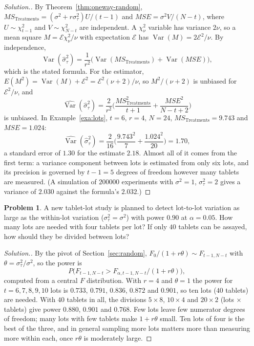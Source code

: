 \documentclass[11pt,a4paper]{article}
\numberwithin{equation}{section}
\DeclareMathOperator{\Var}{Var}
\theoremstyle{definition}
\newtheorem{problemx}{Problem}[subsection]
\newenvironment{problem}{\begin{problemx}}{\end{problemx}}
\newenvironment{solution}
  {\renewcommand{\qedsymbol}{}\begin{proof}[\textit{Solution}.]}
  {\end{proof}}
\begin{document}
\begin{solution}
By Theorem~\ref{thm:oneway-random}, $MS_{\mathrm{Treatments}} = (\sigma^2 + r\sigma^2_\tau)U/(t - 1)$ and $MSE = \sigma^2V/(N - t)$, where $U \sim \chi^2_{t-1}$ and $V \sim \chi^2_{N-t}$ are independent. A
$\chi^2_\nu$ variable has variance $2\nu$, so a mean square $M = \mathcal E\chi^2_\nu/\nu$ with expectation $\mathcal E$ has $\Var(M) = 2\mathcal E^2/\nu$. By independence,
\[
\Var(\hat\sigma^2_\tau) = \frac1{r^2}\bigl(\Var(MS_{\mathrm{Treatments}}) + \Var(MSE)\bigr) ,
\]
which is the stated formula. For the estimator, $E(M^2) = \Var(M) + \mathcal E^2 = \mathcal E^2(\nu + 2)/\nu$, so $M^2/(\nu + 2)$ is unbiased for $\mathcal E^2/\nu$, and
\[
\widehat{\Var}(\hat\sigma^2_\tau) = \frac2{r^2}\biggl(\frac{MS_{\mathrm{Treatments}}^2}{t + 1} + \frac{MSE^2}{N - t + 2}\biggr)
\]
is unbiased. In Example~\ref{exa:lots}, $t = 6$, $r = 4$, $N = 24$, $MS_{\mathrm{Treatments}} = 9.743$ and $MSE = 1.024$:
\[
\widehat{\Var}(\hat\sigma^2_\tau) = \frac2{16}\biggl(\frac{9.743^2}7 + \frac{1.024^2}{20}\biggr) = 1.70 ,
\]
a standard error of $1.30$ for the estimate $2.18$. Almost all of it comes from the first term: a variance component between lots is estimated from
only six lots, and its precision is governed by $t - 1 = 5$ degrees of freedom however many tablets are measured. (A simulation of $200000$
experiments with $\sigma^2 = 1$, $\sigma^2_\tau = 2$ gives a variance of $2.030$ against the formula's $2.032$.)
\end{solution}

\begin{problem}
A new tablet-lot study is planned to detect lot-to-lot variation as large as the within-lot variation ($\sigma^2_\tau = \sigma^2$) with power $0.90$ at $\alpha = 0.05$.
How many lots are needed with four tablets per lot? If only $40$ tablets can be assayed, how should they be divided between lots?
\end{problem}

\begin{solution}
By the pivot of Section~\ref{sec:random}, $F_0/(1 + r\theta) \sim F_{t-1, N-t}$ with $\theta = \sigma^2_\tau/\sigma^2$, so the power is
\[
P\bigl(F_{t-1, N-t} > F_{\alpha, t-1, N-t}/(1 + r\theta)\bigr) ,
\]
computed from a central $F$ distribution. With $r = 4$ and $\theta = 1$ the power for $t = 6, 7, 8, 9, 10$ lots is $0.733$, $0.791$, $0.836$, $0.872$ and $0.901$, so ten lots
($40$ tablets) are needed. With $40$ tablets in all, the divisions $5 \times 8$, $10 \times 4$ and $20 \times 2$ (lots $\times$ tablets) give power $0.880$, $0.901$ and $0.768$. Few lots leave few
numerator degrees of freedom; many lots with few tablets make $1 + r\theta$ small. Ten lots of four is the best of the three, and in general sampling more
lots matters more than measuring more within each, once $r\theta$ is moderately large.
\end{solution}
\end{document}
